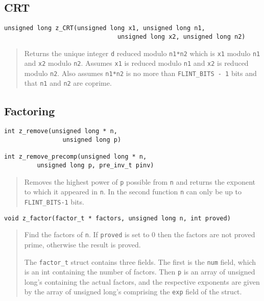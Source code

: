 \documentclass[a4paper,10pt]{article}
\newcommand{\code}{\lstinline}
\begin{document}
\subsection{CRT}

\begin{lstlisting}
unsigned long z_CRT(unsigned long x1, unsigned long n1, 
                               unsigned long x2, unsigned long n2)
\end{lstlisting}
\begin{quote}
Returns the unique integer \code{d} reduced modulo \code{n1*n2} which is \code{x1} modulo \code{n1} and \code{x2} modulo \code{n2}. Assumes \code{x1} is reduced modulo \code{n1} and \code{x2} is reduced modulo \code{n2}. Also assumes \code{n1*n2} is no more than \code{FLINT_BITS - 1} bits and that \code{n1} and \code{n2} are coprime.
\end{quote}

\subsection{Factoring}

\begin{lstlisting}
int z_remove(unsigned long * n, 
                unsigned long p)

int z_remove_precomp(unsigned long * n, 
         unsigned long p, pre_inv_t pinv)
\end{lstlisting}
\begin{quote}
Removes the highest power of \code{p} possible from \code{n} and returns the exponent to which it appeared in \code{n}.  In the second function \code{n} can only be up to \code{FLINT_BITS-1} bits.
\end{quote}

\begin{lstlisting}
void z_factor(factor_t * factors, unsigned long n, int proved)
\end{lstlisting}
\begin{quote}
Find the factors of \code{n}.  If \code{proved} is set to 0 then the factors are not proved prime, otherwise the result is proved.

The \code{factor_t} struct contains three fields. The first is the \code{num} field, which is an int containing the number of factors. Then \code{p} is an array of unsigned long's containing the actual factors, and the respective exponents are given by the array of unsigned long's comprising the \code{exp} field of the struct.
\end{quote}
\end{document}
